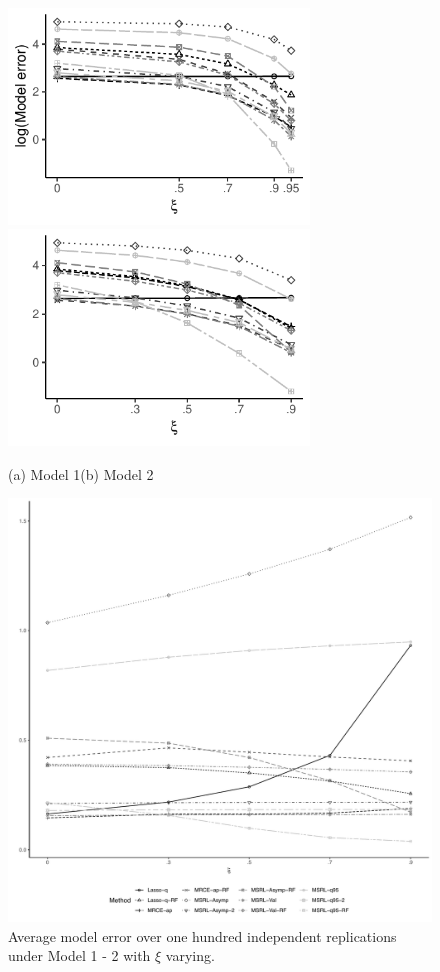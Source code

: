 \documentclass[12pt]{article}
\begin{document}
\begin{figure}[t!]
\centerline{\hfill\includegraphics[width=8cm]{Plots/NormalHet_AR1_ModelErr_TP_April.pdf} \hfill \includegraphics[width=8cm]{Plots/NormalHet_Const_ModelErr_TP_April.pdf}\hfill}
\centerline{\hfill (a) Model 1\hfill \quad \hfill (b) Model 2 \hfill}
\centerline{\hfill\includegraphics[width=16cm]{Plots/TP_LegendGet.pdf}\hfill} 
\caption{Average model error over one hundred independent replications under Model 1 - 2 with $\xi$ varying.}\label{fig:TP_Results}
\end{figure}
\end{document}
